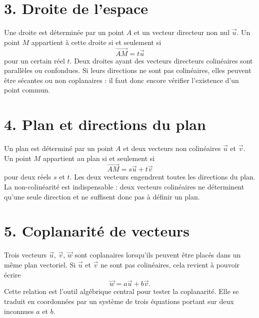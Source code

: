 
\section{3. Droite de l’espace}
Une droite est déterminée par un point $A$ et un vecteur directeur non nul $\vec u$. Un point $M$ appartient à cette droite si et seulement si
\[
\overrightarrow{AM}=t\vec u
\]
pour un certain réel $t$. Deux droites ayant des vecteurs directeurs colinéaires sont parallèles ou confondues. Si leurs directions ne sont pas colinéaires, elles peuvent être sécantes ou non coplanaires : il faut donc encore vérifier l'existence d'un point commun.

\section{4. Plan et directions du plan}
Un plan est déterminé par un point $A$ et deux vecteurs non colinéaires $\vec u$ et $\vec v$. Un point $M$ appartient au plan si et seulement si
\[
\overrightarrow{AM}=s\vec u+t\vec v
\]
pour deux réels $s$ et $t$. Les deux vecteurs engendrent toutes les directions du plan. La non-colinéarité est indispensable : deux vecteurs colinéaires ne déterminent qu'une seule direction et ne suffisent donc pas à définir un plan.

\section{5. Coplanarité de vecteurs}
Trois vecteurs $\vec u$, $\vec v$, $\vec w$ sont coplanaires lorsqu'ils peuvent être placés dans un même plan vectoriel. Si $\vec u$ et $\vec v$ ne sont pas colinéaires, cela revient à pouvoir écrire
\[
\vec w=a\vec u+b\vec v.
\]
Cette relation est l'outil algébrique central pour tester la coplanarité. Elle se traduit en coordonnées par un système de trois équations portant sur deux inconnues $a$ et $b$.


